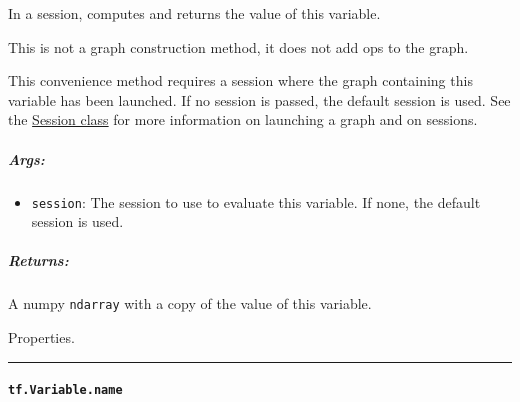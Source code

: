 In a session, computes and returns the value of this variable.

This is not a graph construction method, it does not add ops to the
graph.

This convenience method requires a session where the graph containing
this variable has been launched. If no session is passed, the default
session is used. See the
\href{../../api_docs/python/client.md\#Session}{Session class} for more
information on launching a graph and on sessions.

\begin{Shaded}
\begin{Highlighting}[]
\OperatorTok{=} \NormalTok{tf.Variable([}\NormalTok{, }\NormalTok{])}
\OperatorTok{=} 

  
     
     \NormalTok{()}
\end{Highlighting}
\end{Shaded}

\subparagraph{Args: }\label{args-6}

\begin{itemize}
\tightlist
\item
  \lstinline{session}: The session to use to evaluate this variable. If
  none, the default session is used.
\end{itemize}

\subparagraph{Returns: }\label{returns-7}

A numpy \lstinline{ndarray} with a copy of the value of this variable.

Properties.

\begin{center}\rule{0.5\linewidth}{\linethickness}\end{center}

\paragraph{\texorpdfstring{\lstinline{tf.Variable.name}
}{tf.Variable.name }}\label{tf.variable.name}


